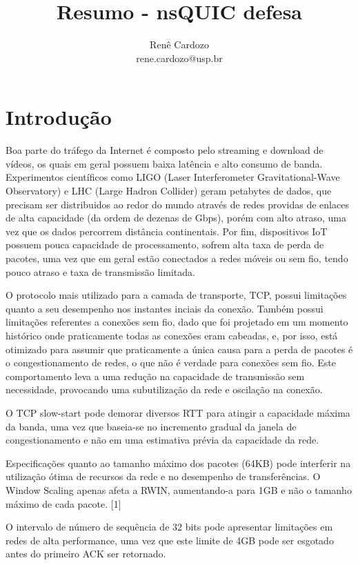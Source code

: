 \documentclass{article}
\author{Renê Cardozo \\ 
        rene.cardozo@usp.br}
\date{}
\title{Resumo - nsQUIC defesa}
\begin{document}
\maketitle

\section{Introdução}
Boa parte do tráfego da Internet é composto pelo streaming e download de vídeos, os quais em geral possuem baixa
latência e alto consumo de banda. Experimentos científicos como LIGO (Laser Interferometer Gravitational-Wave
Observatory) e LHC (Large Hadron Collider) geram petabytes de dados, que precisam ser distribuidos ao redor do mundo
através de redes providas de enlaces de alta capacidade (da ordem de dezenas de Gbps), porém com alto atraso, uma vez
que os dados percorrem distância continentais. Por fim, dispositivos IoT possuem pouca capacidade de processamento,
sofrem alta taxa de perda de pacotes, uma vez que em geral estão conectados a redes móveis ou sem fio, tendo pouco
atraso e taxa de transmissão limitada.

O protocolo mais utilizado para a camada de transporte, TCP, possui limitações quanto a seu desempenho nos instantes
inciais da conexão. Também possui limitações referentes a conexões sem fio, dado que foi projetado em um momento histórico
onde praticamente todas as conexões eram cabeadas, e, por isso, está otimizado para assumir que praticamente a única causa para a
perda de pacotes é o congestionamento de redes, o que não é verdade para conexões sem fio. Este comportamento leva a uma
redução na capacidade de transmissão sem necessidade, provocando uma subutilização da rede e oscilação na conexão.

O TCP slow-start pode demorar diversos RTT para atingir a capacidade máxima da banda, uma vez que baseia-se no
incremento gradual da janela de congestionamento e não em uma estimativa prévia da capacidade da rede.

Especificações quanto ao tamanho máximo dos pacotes (64KB) pode interferir na utilização ótima de recursos da rede e no
desempenho de transferências. O Window Scaling apenas afeta a RWIN, aumentando-a para 1GB e não o tamanho máximo de cada
pacote. [1]

O intervalo de número de sequência de 32 bits pode apresentar limitações em redes de alta performance, uma vez que este
limite de 4GB pode ser esgotado antes do primeiro ACK ser retornado.

\end{document}
